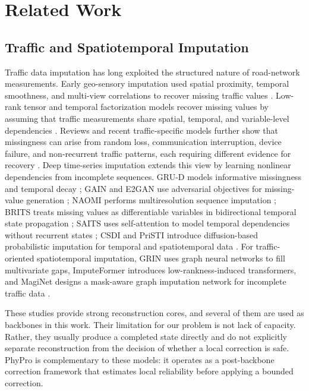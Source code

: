 \documentclass[preprint,12pt]{elsarticle}
\begin{document}
\section{Related Work}

\subsection{Traffic and Spatiotemporal Imputation}
Traffic data imputation has long exploited the structured nature of road-network measurements. Early geo-sensory imputation used spatial proximity, temporal smoothness, and multi-view correlations to recover missing traffic values \citep{yi2016stmvl}. Low-rank tensor and temporal factorization models recover missing values by assuming that traffic measurements share spatial, temporal, and variable-level dependencies \citep{chen2020nonconvex,chen2021scalable,chen2022latc}. Reviews and recent traffic-specific models further show that missingness can arise from random loss, communication interruption, device failure, and non-recurrent traffic patterns, each requiring different evidence for recovery \citep{chan2023trafficreview,shen2023garnn,huang2023stgain,xu2024hstgcn,zhang2024mlgan}. Deep time-series imputation extends this view by learning nonlinear dependencies from incomplete sequences. GRU-D models informative missingness and temporal decay \citep{che2018grud}; GAIN and E2GAN use adversarial objectives for missing-value generation \citep{yoon2018gain,luo2019e2gan}; NAOMI performs multiresolution sequence imputation \citep{liu2019naomi}; BRITS treats missing values as differentiable variables in bidirectional temporal state propagation \citep{cao2018brits}; SAITS uses self-attention to model temporal dependencies without recurrent states \citep{du2023saits}; CSDI and PriSTI introduce diffusion-based probabilistic imputation for temporal and spatiotemporal data \citep{tashiro2021csdi,liu2023pristi}. For traffic-oriented spatiotemporal imputation, GRIN uses graph neural networks to fill multivariate gaps, ImputeFormer introduces low-rankness-induced transformers, and MagiNet designs a mask-aware graph imputation network for incomplete traffic data \citep{cini2022grin,liu2024imputeformer,liu2025maginet}.

These studies provide strong reconstruction cores, and several of them are used as backbones in this work. Their limitation for our problem is not lack of capacity. Rather, they usually produce a completed state directly and do not explicitly separate reconstruction from the decision of whether a local correction is safe. PhyPro is complementary to these models: it operates as a post-backbone correction framework that estimates local reliability before applying a bounded correction.
\end{document}

